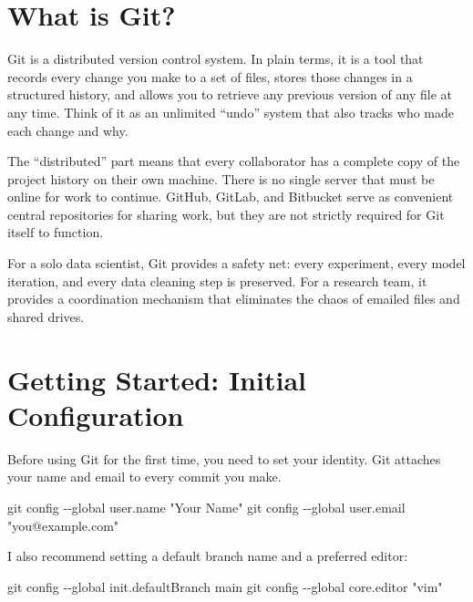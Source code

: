 \documentclass[
  letterpaper,
  DIV=11,
  numbers=noendperiod]{scrartcl}
\newenvironment{Shaded}{\begin{snugshade}}{\end{snugshade}}
\newcommand{\AttributeTok}[1]{\textcolor[rgb]{0.40,0.45,0.13}{#1}}
\newcommand{\FunctionTok}[1]{\textcolor[rgb]{0.28,0.35,0.67}{#1}}
\newcommand{\NormalTok}[1]{\textcolor[rgb]{0.00,0.23,0.31}{#1}}
\newcommand{\StringTok}[1]{\textcolor[rgb]{0.13,0.47,0.30}{#1}}
\begin{document}
\section{What is Git?}\label{what-is-git}

Git is a distributed version control system. In plain terms, it is a
tool that records every change you make to a set of files, stores those
changes in a structured history, and allows you to retrieve any previous
version of any file at any time. Think of it as an unlimited ``undo''
system that also tracks who made each change and why.

The ``distributed'' part means that every collaborator has a complete
copy of the project history on their own machine. There is no single
server that must be online for work to continue. GitHub, GitLab, and
Bitbucket serve as convenient central repositories for sharing work, but
they are not strictly required for Git itself to function.

For a solo data scientist, Git provides a safety net: every experiment,
every model iteration, and every data cleaning step is preserved. For a
research team, it provides a coordination mechanism that eliminates the
chaos of emailed files and shared drives.

\section{Getting Started: Initial
Configuration}\label{getting-started-initial-configuration}

Before using Git for the first time, you need to set your identity. Git
attaches your name and email to every commit you make.

\begin{Shaded}
\begin{Highlighting}[]
\FunctionTok{git}\NormalTok{ config }\AttributeTok{{-}{-}global}\NormalTok{ user.name }\StringTok{"Your Name"}
\FunctionTok{git}\NormalTok{ config }\AttributeTok{{-}{-}global}\NormalTok{ user.email }\StringTok{"you@example.com"}
\end{Highlighting}
\end{Shaded}

I also recommend setting a default branch name and a preferred editor:

\begin{Shaded}
\begin{Highlighting}[]
\FunctionTok{git}\NormalTok{ config }\AttributeTok{{-}{-}global}\NormalTok{ init.defaultBranch main}
\FunctionTok{git}\NormalTok{ config }\AttributeTok{{-}{-}global}\NormalTok{ core.editor }\StringTok{"vim"}
\end{Highlighting}
\end{Shaded}
\end{document}
